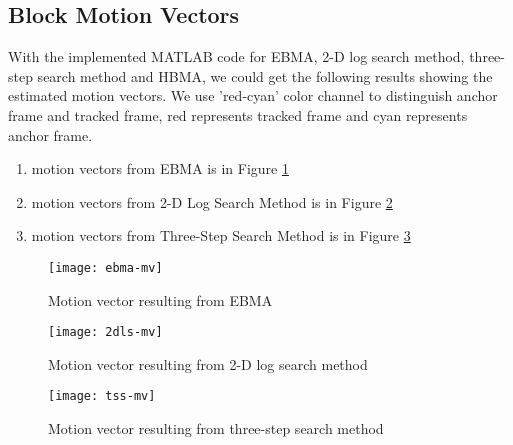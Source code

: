 \documentclass[a4paper, twocolumn]{article}
\begin{document}
	\subsection{Block Motion Vectors}
	With the implemented MATLAB code for EBMA, 2-D log search method, three-step search method and HBMA, we could get the following results showing the estimated motion vectors. We use 'red-cyan' color channel to distinguish anchor frame and tracked frame, red represents tracked frame and cyan represents anchor frame.
	\begin{enumerate}
		\item motion vectors from EBMA is in Figure \ref{fig:ebma-mv}
		\item motion vectors from 2-D Log Search Method is in Figure \ref{fig:2dls-mv}
		\item motion vectors from Three-Step Search Method is in Figure \ref{fig:tss-mv}
	\end{enumerate}
	\begin{figure}[h]
	\centering
	\texttt{[image: ebma-mv]}
	\caption{Motion vector resulting from EBMA}
	\label{fig:ebma-mv}
	\end{figure}

	\begin{figure}[h]
	\centering
	\texttt{[image: 2dls-mv]}
	\caption{Motion vector resulting from 2-D log search method}
	\label{fig:2dls-mv}
	\end{figure}

	\begin{figure}[h]
	\centering
	\texttt{[image: tss-mv]}
	\caption{Motion vector resulting from three-step search method}
	\label{fig:tss-mv}
	\end{figure}
\end{document}
